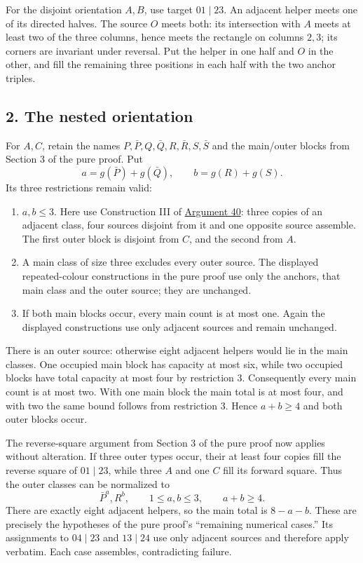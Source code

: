 \documentclass[
  10pt,
]{article}
\providecommand{\tightlist}{%
  \setlength{\itemsep}{0pt}\setlength{\parskip}{0pt}}
\begin{document}
For the disjoint orientation \(A,B\), use target \(01\mid23\). An
adjacent helper meets one of its directed halves. The source \(O\) meets
both: its intersection with \(A\) meets at least two of the three
columns, hence meets the rectangle on columns \(2,3\); its corners are
invariant under reversal. Put the helper in one half and \(O\) in the
other, and fill the remaining three positions in each half with the two
anchor triples.

\hypertarget{the-nested-orientation}{%
\subsection*{2. The nested orientation}\label{the-nested-orientation}}

For \(A,C\), retain the names \(P,\bar P,Q,\bar Q,R,\bar R,S,\bar S\)
and the main/outer blocks from Section 3 of the pure proof. Put \[
a=g(\bar P)+g(\bar Q),\qquad b=g(R)+g(S).
\] Its three restrictions remain valid:

\begin{enumerate}
\def\labelenumi{\arabic{enumi}.}
\tightlist
\item
  \(a,b\le3\). Here use Construction III of
  \protect\hyperlink{arg-40}{Argument 40}: three copies of an adjacent
  class, four sources disjoint from it and one opposite source assemble.
  The first outer block is disjoint from \(C\), and the second from
  \(A\).
\item
  A main class of size three excludes every outer source. The displayed
  repeated-colour constructions in the pure proof use only the anchors,
  that main class and the outer source; they are unchanged.
\item
  If both main blocks occur, every main count is at most one. Again the
  displayed constructions use only adjacent sources and remain
  unchanged.
\end{enumerate}

There is an outer source: otherwise eight adjacent helpers would lie in
the main classes. One occupied main block has capacity at most six,
while two occupied blocks have total capacity at most four by
restriction 3. Consequently every main count is at most two. With one
main block the main total is at most four, and with two the same bound
follows from restriction 3. Hence \(a+b\ge4\) and both outer blocks
occur.

The reverse-square argument from Section 3 of the pure proof now applies
without alteration. If three outer types occur, their at least four
copies fill the reverse square of \(01\mid23\), while three \(A\) and
one \(C\) fill its forward square. Thus the outer classes can be
normalized to \[
\bar P^a,R^b,\qquad 1\le a,b\le3,\qquad a+b\ge4.
\] There are exactly eight adjacent helpers, so the main total is
\(8-a-b\). These are precisely the hypotheses of the pure proof's
``remaining numerical cases.'' Its assignments to \(04\mid23\) and
\(13\mid24\) use only adjacent sources and therefore apply verbatim.
Each case assembles, contradicting failure.
\end{document}
